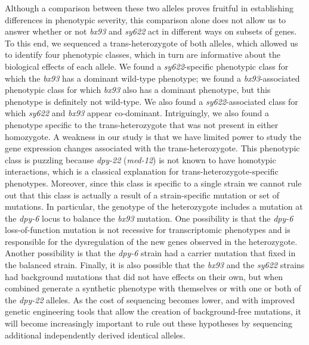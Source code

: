 \documentclass[10pt, onecolumn]{article}
\newcommand{\gene}[1]{\mbox{\emph{#1}}}
\newcommand{\dpy}{\gene{dpy-22} (\emph{med-12})}
\begin{document}
Although a comparison between these two alleles proves fruitful in establishing
differences in phenotypic severity, this comparison alone does not allow us to
answer whether or not \emph{bx93} and \emph{sy622} act in different ways on
subsets of genes. To this end, we sequenced a trans-heterozygote of both alleles,
which allowed us to identify four phenotypic classes, which in turn are informative
about the biological effects of each allele. We found a \emph{sy622}-specific
phenotypic class for which the \emph{bx93} has a dominant wild-type phenotype;
we found a \emph{bx93}-associated phenotypic class for which \emph{bx93} also has
a dominant phenotype, but this phenotype is definitely not wild-type. We also
found a \emph{sy622}-associated class for which \emph{sy622} and \emph{bx93}
appear co-dominant. Intriguingly, we also found a phenotype specific to the
trans-heterozygote that was not present in either homozygote. A weakness in our
study is that we have limited power to study the gene expression changes
associated with the trans-heterozygote. This phenotypic class is puzzling
because \dpy{} is not known to have homotypic interactions, which is a classical
explanation for trans-heterozygote-specific phenotypes. Moreover, since this
class is specific to a single strain we cannot rule out that this class is
actually a result of a strain-specific mutation or set of mutations. In particular,
the genotype of the heterozygote includes a mutation at the \gene{dpy-6} locus
to balance the \emph{bx93} mutation. One possibility is that the \emph{dpy-6}
loss-of-function mutation is not recessive for transcriptomic phenotypes and
is responsible for the dysregulation of the new genes observed in the heterozygote.
Another possibility is that the \emph{dpy-6} strain had a carrier mutation that
fixed in the balanced strain. Finally, it is also possible that the
\emph{bx93} and the \emph{sy622} strains had background mutations that did not
have effects on their own, but when combined generate a synthetic phenotype with
themselves or with one or both of the \gene{dpy-22} alleles.
As the cost of sequencing becomes lower, and with improved genetic engineering
tools that allow the creation of background-free mutations, it will become
increasingly important to rule out these hypotheses by sequencing additional
independently derived identical alleles.
\end{document}
